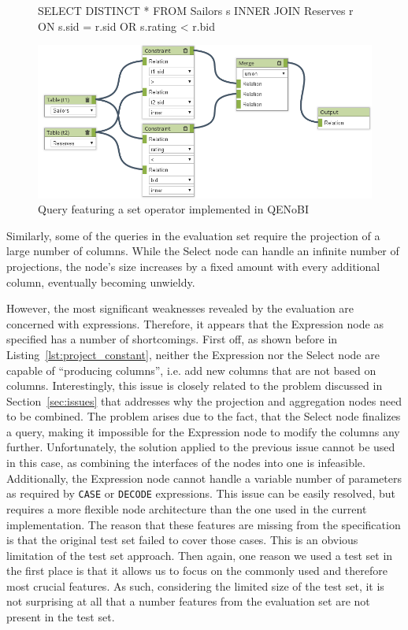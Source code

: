 \documentclass[11pt,a4paper]{globis-book}
\begin{document}
\begin{figure}[h]
\begin{codeex}[]
SELECT DISTINCT *
FROM
  Sailors s INNER JOIN Reserves r
  ON s.sid = r.sid OR s.rating < r.bid
\end{codeex}

  \centering
  \includegraphics[width=\textwidth]{resources/JoinOR.png}
  \caption{Query featuring a set operator implemented in QENoBI}
  \label{fig:eval_join_or}
\end{figure}

Similarly, some of the queries in the evaluation set require the projection of a large number of columns. While the Select node can handle an infinite number of projections, the node's size increases by a fixed amount with every additional column, eventually becoming unwieldy.

However, the most significant weaknesses revealed by the evaluation are concerned with expressions. Therefore, it appears that the Expression node as specified has a number of shortcomings. First off, as shown before in Listing~\ref{lst:project_constant}, neither the Expression nor the Select node are capable of ``producing columns'', i.e. add new columns that are not based on columns. Interestingly, this issue is closely related to the problem discussed in Section~\ref{sec:issues} that addresses why the projection and aggregation nodes need to be combined. The problem arises due to the fact, that the Select node finalizes a query, making it impossible for the Expression node to modify the columns any further. Unfortunately, the solution applied to the previous issue cannot be used in this case, as combining the interfaces of the nodes into one is infeasible. Additionally, the Expression node cannot handle a variable number of parameters as required by \texttt{CASE} or \texttt{DECODE} expressions. This issue can be easily resolved, but requires a more flexible node architecture than the one used in the current implementation. The reason that these features are missing from the specification is that the original test set failed to cover those cases. This is an obvious limitation of the test set approach. Then again, one reason we used a test set in the first place is that it allows us to focus on the commonly used and therefore most crucial features. As such, considering the limited size of the test set, it is not surprising at all that a number features from the evaluation set are not present in the test set.
\end{document}
